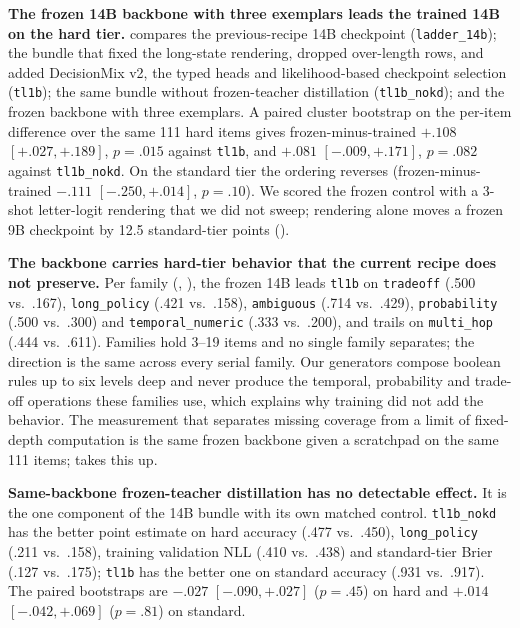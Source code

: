 \textbf{The frozen 14B backbone with three exemplars leads the trained 14B on the hard tier.}
 compares the previous-recipe 14B checkpoint (\texttt{ladder\_14b}); the bundle that
fixed the long-state rendering, dropped over-length rows, and added DecisionMix v2, the typed heads and
likelihood-based checkpoint selection (\texttt{tl1b}); the same bundle without frozen-teacher
distillation (\texttt{tl1b\_nokd}); and the frozen backbone with three exemplars. A paired cluster
bootstrap on the per-item difference over the same 111 hard items gives frozen-minus-trained $+.108$
$[+.027, +.189]$, $p{=}.015$ against \texttt{tl1b}, and $+.081$ $[-.009, +.171]$, $p{=}.082$ against
\texttt{tl1b\_nokd}. On the standard tier the ordering reverses (frozen-minus-trained $-.111$
$[-.250, +.014]$, $p{=}.10$). We scored the frozen control with a 3-shot letter-logit rendering that
we did not sweep; rendering alone moves a frozen 9B checkpoint by 12.5 standard-tier points
().

\textbf{The backbone carries hard-tier behavior that the current recipe does not preserve.} Per family
(, ), the frozen 14B leads \texttt{tl1b} on
\texttt{tradeoff} (.500 vs.\ .167), \texttt{long\_policy} (.421 vs.\ .158), \texttt{ambiguous} (.714
vs.\ .429), \texttt{probability} (.500 vs.\ .300) and \texttt{temporal\_numeric} (.333 vs.\ .200), and
trails on \texttt{multi\_hop} (.444 vs.\ .611). Families hold 3--19 items and no single family
separates; the direction is the same across every serial family. Our generators compose boolean rules up
to six levels deep and never produce the temporal, probability and trade-off operations these families
use, which explains why training did not add the behavior. The measurement that separates missing
coverage from a limit of fixed-depth computation is the same frozen backbone given a scratchpad on the
same 111 items;  takes this up.

\textbf{Same-backbone frozen-teacher distillation has no detectable effect.} It is the one component of
the 14B bundle with its own matched control. \texttt{tl1b\_nokd} has the better point estimate on hard
accuracy (.477 vs.\ .450), \texttt{long\_policy} (.211 vs.\ .158), training validation NLL (.410 vs.\
.438) and standard-tier Brier (.127 vs.\ .175); \texttt{tl1b} has the better one on standard accuracy
(.931 vs.\ .917). The paired bootstraps are $-.027$ $[-.090, +.027]$ ($p{=}.45$) on hard and $+.014$
$[-.042, +.069]$ ($p{=}.81$) on standard.

